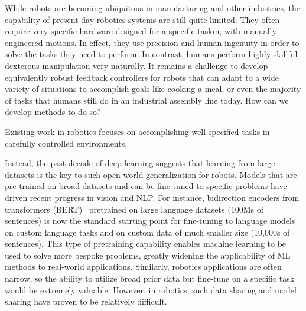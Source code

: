 While robots are becoming ubiquitous in manufacturing and other industries, the capability of present-day robotics systems are still quite limited. They often require very specific hardware designed for a specific taskm, with manually engineered motions. In effect, they use precision and human ingenuity in order to solve the tasks they need to perform. In contrast, humans perform highly skillful dexterous manipulation very naturally. It remains a challenge to develop equivalently robust feedback controllers for robots that can adapt to a wide variety of situations to accomplish goals like cooking a meal, or even the majority of tasks that humans still do in an industrial assembly line today. How can we develop methods to do so?

Existing work in robotics focuses on accomplishing well-specified tasks in carefully controlled environments.

Instead, the past decade of deep learning suggests that learning from large datasets is the key to such open-world generalization for robots.
Models that are pre-trained on broad datasets and can be fine-tuned to specific problems have driven recent progress in vision and NLP.
For instance, bidirection encoders from transformers (BERT)~\cite{devlin2019bert} pretrained on large language datasets (100Ms of sentences) is now the standard starting point for fine-tuning to language models on custom language tasks and on custom data of much smaller size (10,000s of sentences).
This type of pretraining capability enables machine learning to be used to solve more bespoke problems, greatly widening the applicability of ML methods to real-world applications.
Similarly, robotics applications are often narrow, so the ability to utilize broad prior data but fine-tune on a specific task would be extremely valuable.
However, in robotics, such data sharing and model sharing have proven to be relatively difficult.







